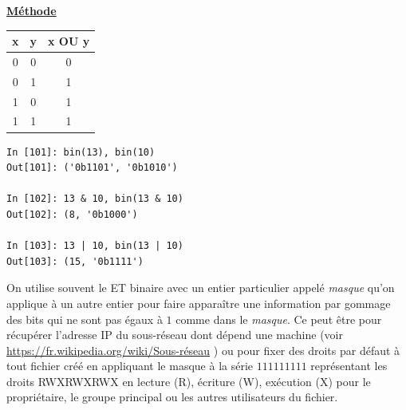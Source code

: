 \documentclass[a4paper, french, 12pt]{article}  %
\newenvironment{methode}[1]
{\par \medskip   \begin{framed} \noindent\underline{\textbf{Méthode}} \hspace{0.5cm}{\itshape #1} \vspace*{10pt} \par  }
{\end{framed} \par \medskip }
\newcounter{prop}
\begin{document}
\begin{methode}{Opérateurs bit à bit}
\begin{itemize}
\begin{minipage}{0.4\linewidth}
\begin{center}
\medskip
\begin{tabular}{|c|c|c|}
\hline
x &  y & x OU y \\
\hline
0 & 0 & 0  \\
\hline
0 & 1 &  1 \\
\hline
1 & 0 & 1 \\
\hline
1 & 1 & 1 \\
\hline
\end{tabular}
\end{center}
\end{minipage}

\bigskip

\begin{lstlisting}
In [101]: bin(13), bin(10)
Out[101]: ('0b1101', '0b1010')

In [102]: 13 & 10, bin(13 & 10)
Out[102]: (8, '0b1000')

In [103]: 13 | 10, bin(13 | 10)
Out[103]: (15, '0b1111')
\end{lstlisting}
\end{itemize}

On utilise souvent le ET binaire avec un entier particulier appelé \textit{masque} qu'on applique à un autre entier pour faire apparaître  une information par \og{} gommage  \fg{} des bits  qui ne sont pas égaux à $1$ comme dans le \textit{masque}. Ce peut être pour récupérer l'adresse IP du sous-réseau dont dépend une machine (voir \url{https://fr.wikipedia.org/wiki/Sous-réseau} ) ou pour fixer des droits par défaut à tout  fichier créé en appliquant le masque à la série  $111111111$ représentant les droits RWXRWXRWX en lecture (R), écriture (W), exécution (X) pour le propriétaire, le groupe principal ou les autres utilisateurs du fichier.
\end{methode}
\end{document}
